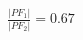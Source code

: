 \documentclass[preview]{standalone}
\begin{document}
\begin{align*}
\frac{|PF_1|}{|PF_2|} = 0.67
\end{align*}
\end{document}
